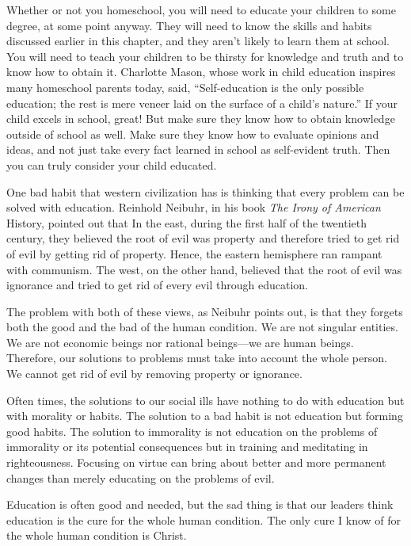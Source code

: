 Whether or not you homeschool, you will need to educate your children
to some degree, at
some point anyway.  They will need to know the skills and habits
discussed earlier in this chapter, and they aren't
likely to learn them at school. You will need to teach your children to
be thirsty for knowledge and truth and to know how to obtain it.
Charlotte Mason, whose work in child education inspires many homeschool
parents today, said, “Self-education is the only possible education;
the rest is mere veneer laid on the surface of a
child's nature.”  If
your child excels in
school, great!  But make sure they know how to obtain knowledge outside
of school as
well. Make sure they
know how to evaluate opinions and ideas, and not just take every fact
learned in school as self-evident truth. Then you can truly consider
your child educated.

\begin{policynote}
One bad habit that western civilization has is thinking that every
problem can be solved with education. Reinhold Neibuhr, in his book
\textit{The Irony of American }History, pointed out that In the east,
during the first half of the twentieth century, they believed the root
of evil was property and therefore tried to get rid of evil by getting
rid of property. Hence, the eastern hemisphere ran rampant with
communism. The west, on the other hand, believed that the root of evil
was ignorance and tried to get rid of every evil through education.

The problem with both of these views, as Neibuhr points out, is that
they forgets both the good and the bad of the human condition. We are
not singular entities. We are not economic beings nor rational
beings—we are human beings. Therefore, our solutions to problems must
take into account the whole person.  We cannot get rid of evil by
removing property or ignorance.

Often times, the solutions to our social ills have nothing to do with
education but with morality or habits. The solution to a bad habit is
not education but forming good habits. The solution to immorality is
not education on the problems
of immorality or its
potential consequences but in training and meditating in righteousness.
 Focusing on virtue can bring about better and more permanent changes
than merely educating on the problems of evil.

Education is often good and needed, but the sad thing is that our
leaders think education is the cure for the whole human condition. The
only cure I know of for the whole human condition is Christ.
\end{policynote}

